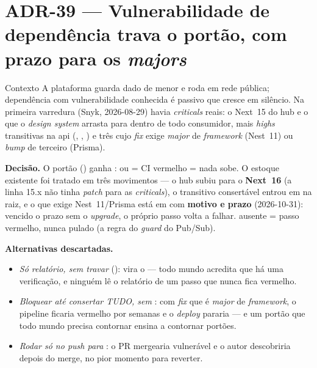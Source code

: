 \section{ADR-39 --- Vulnerabilidade de dependência trava o portão, com prazo para os \emph{majors}}
\label{adr:snyk-no-portao}

\begin{especificacao}{Contexto}
A plataforma guarda dado de menor e roda em rede pública; dependência com
vulnerabilidade conhecida é passivo que cresce em silêncio. Na primeira
varredura (Snyk, 2026-08-29) havia \emph{criticals} reais: o Next~15 do hub e o
 que o \emph{design system} arrasta para dentro de todo
consumidor, mais \emph{highs} transitivas na api (, ,
) e três cujo \emph{fix} exige \emph{major} de \emph{framework}
(Nest~11) ou \emph{bump} de terceiro (Prisma).
\end{especificacao}

\textbf{Decisão.} O portão () ganha
:  ou
 = CI vermelho = nada sobe. O estoque existente foi tratado em
três movimentos --- o hub subiu para o \textbf{Next~16} (a linha 15.x não tinha
\emph{patch} para as \emph{criticals}), o transitivo consertável entrou em
 na raiz, e o que exige Nest~11/Prisma está em
 com \textbf{motivo e prazo} (2026-10-31): vencido o prazo
sem o \emph{upgrade}, o próprio passo volta a falhar.  ausente
= passo vermelho, nunca pulado (a regra do \emph{guard} do Pub/Sub).

\textbf{Alternativas descartadas.}
\begin{itemize}
  \item \emph{Só relatório, sem travar} (): vira o
     --- todo mundo acredita que há uma verificação, e ninguém
    lê o relatório de um passo que nunca fica vermelho.
  \item \emph{Bloquear até consertar TUDO, sem }: com \emph{fix} que
    é \emph{major} de \emph{framework}, o pipeline ficaria vermelho por semanas
    e o \emph{deploy} pararia --- e um portão que todo mundo precisa contornar
    ensina a contornar portões.
  \item \emph{Rodar só no push para }: o PR mergearia vulnerável e o
    autor descobriria depois do merge, no pior momento para reverter.
\end{itemize}

